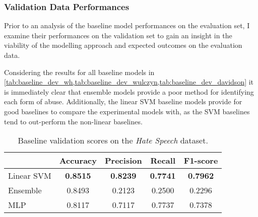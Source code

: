 \begin{table}[h]
  \centering
  \caption{Best hyper parameters for non-linear single task model for each main task dataset.}
  \label{tab:MLP_singletask_params}
\end{table}

\subsubsection{Validation Data Performances}
Prior to an analysis of the baseline model performances on the evaluation set, I examine their performances on the validation set to gain an insight in the viability of the modelling approach and expected outcomes on the evaluation data.

Considering the results for all baseline models in \cref{tab:baseline_dev_wh,tab:baseline_dev_wulczyn,tab:baseline_dev_davidson} it is immediately clear that ensemble models provide a poor method for identifying each form of abuse.
Additionally, the linear SVM baseline models provide for good baselines to compare the experimental models with, as the SVM baselines tend to out-perform the non-linear baselines.

\begin{table}[h]
  \centering
  \begin{tabular}{l|cccc}
               & Accuracy        & Precision       & Recall          & F1-score        \\ \hline
    Linear SVM & \textbf{0.8515} & \textbf{0.8239} & \textbf{0.7741} & \textbf{0.7962} \\
    Ensemble   & 0.8493          & 0.2123          & 0.2500          & 0.2296          \\
    MLP        & 0.8117          & 0.7117          & 0.7737          & 0.7378
  \end{tabular}
  \caption{Baseline validation scores on the \textit{Hate Speech} dataset.}
  \label{tab:baseline_dev_wh}
\end{table}

